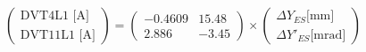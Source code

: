 \documentclass[11pt,letter,english]{article}
\begin{document}
\begin{equation}
\left( \begin{array}{c}
\mbox{DVT4L1 [A]}   \\
\mbox{DVT11L1 [A]}  \end{array} \right) 
=
\left( \begin{array}{cc}
-0.4609  &    15.48 \\                 
  2.886  &    -3.45 \end{array} \right)
\times
\left( \begin{array}{c}
\Delta Y_{ES}  \mbox{[mm]}   \\
\Delta Y'_{ES} \mbox{[mrad]} \end{array} \right) 
\end{equation}
\end{document}
